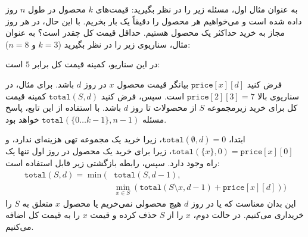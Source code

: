 به عنوان مثال اول، مسئله زیر را در نظر بگیرید:
قیمت‌های $k$ محصول در طول $n$ روز داده شده است
و می‌خواهیم هر محصول را دقیقاً یک بار بخریم.
با این حال، در هر روز مجاز به خرید حداکثر یک محصول هستیم.
حداقل قیمت کل چقدر است؟
به عنوان مثال، سناریوی زیر را در نظر بگیرید ($k=3$ و $n=8$):
\begin{center}
\end{center}
در این سناریو، کمینه قیمت کل برابر $5$ است:
\begin{center}
\end{center}

فرض کنید $\texttt{price}[x][d]$ بیانگر قیمت محصول $x$
در روز $d$ باشد.
برای مثال، در سناریوی بالا $\texttt{price}[2][3] = 7$ است.
سپس، فرض کنید $\texttt{total}(S,d)$ کمینه قیمت کل
برای خرید زیرمجموعه $S$ از محصولات تا روز $d$ باشد.
با استفاده از این تابع، پاسخ مسئله
$\texttt{total}(\{0 \ldots k-1\},n-1)$ خواهد بود.

ابتدا، $\texttt{total}(\emptyset,d) = 0$،
زیرا خرید یک مجموعه تهی هزینه‌ای ندارد،
و $\texttt{total}(\{x\},0) = \texttt{price}[x][0]$،
زیرا برای خرید یک محصول در روز اول تنها یک راه وجود دارد.
سپس، رابطه بازگشتی زیر قابل استفاده است:
\begin{equation*}
\begin{split}
\texttt{total}(S,d) = \min( & \texttt{total}(S,d-1), \\
& \min_{x \in S} (\texttt{total}(S \setminus x,d-1)+\texttt{price}[x][d]))
\end{split}
\end{equation*}
این بدان معناست که یا در روز $d$ هیچ محصولی نمی‌خریم
یا محصول $x$ متعلق به $S$ را خریداری می‌کنیم.
در حالت دوم، $x$ را از $S$ حذف کرده و قیمت
$x$ را به قیمت کل اضافه می‌کنیم.

